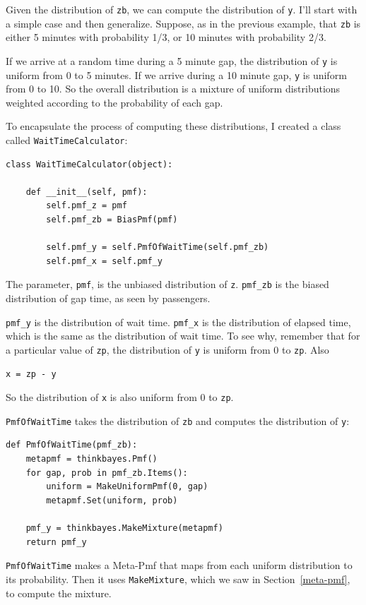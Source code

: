 \documentclass[12pt]{book}
\begin{document}
Given the distribution of {\tt zb}, we can compute the distribution of
{\tt y}.  I'll start with a simple case and then generalize.
Suppose, as in the previous example, that {\tt zb} is either 5 minutes
with probability 1/3, or 10 minutes with probability 2/3.

If we arrive at a random time during a 5 minute gap, the distribution
of {\tt y} is uniform from 0 to 5 minutes.  If we arrive during a 10
minute gap, {\tt y} is uniform from 0 to 10.  So the overall
distribution is a mixture of uniform distributions weighted
according to the probability of each gap.

To encapsulate the process of computing these distributions, I
created a class called {\tt WaitTimeCalculator}:

\begin{verbatim}
class WaitTimeCalculator(object):

    def __init__(self, pmf):
        self.pmf_z = pmf
        self.pmf_zb = BiasPmf(pmf)

        self.pmf_y = self.PmfOfWaitTime(self.pmf_zb)
        self.pmf_x = self.pmf_y
\end{verbatim}

The parameter, {\tt pmf}, is the unbiased distribution of {\tt z}.
\verb"pmf_zb" is the biased distribution of gap time, as seen by
passengers.

\verb"pmf_y" is the distribution of wait time.  \verb"pmf_x" is the
distribution of elapsed time, which is the same as the distribution of
wait time.  To see why, remember that for a particular value of
{\tt zp}, the distribution of {\tt y} is uniform from 0 to {\tt zp}.
Also
%
\begin{verbatim}
x = zp - y
\end{verbatim}
%
So the distribution of {\tt x} is also uniform from 0 to {\tt zp}.

{\tt PmfOfWaitTime} takes the distribution of {\tt zb} and
computes the distribution of {\tt y}:

\begin{verbatim}
def PmfOfWaitTime(pmf_zb):
    metapmf = thinkbayes.Pmf()
    for gap, prob in pmf_zb.Items():
        uniform = MakeUniformPmf(0, gap)
        metapmf.Set(uniform, prob)

    pmf_y = thinkbayes.MakeMixture(metapmf)
    return pmf_y
\end{verbatim}

{\tt PmfOfWaitTime} makes a Meta-Pmf that maps from each uniform
distribution to its probability.  Then it uses {\tt MakeMixture},
which we saw in Section~\ref{meta-pmf}, to compute the mixture.
\end{document}
